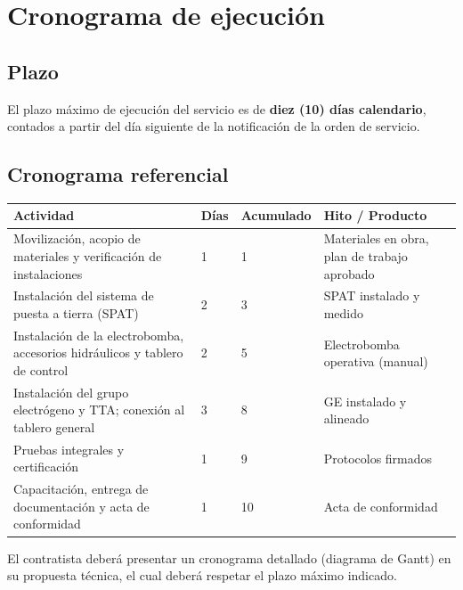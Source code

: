 \documentclass[12pt,a4paper]{article}
\begin{document}
\section{Cronograma de ejecución}

\subsection{Plazo}

El plazo máximo de ejecución del servicio es de \textbf{diez (10) días calendario}, contados a partir del día siguiente de la notificación de la orden de servicio.

\subsection{Cronograma referencial}

\begin{center}
\begin{tabular}{L{5cm}L{1.5cm}L{2cm}L{4.5cm}}
\toprule
\textbf{Actividad} & \textbf{Días} & \textbf{Acumulado} & \textbf{Hito / Producto} \\
\midrule
Movilización, acopio de materiales y verificación de instalaciones & 1 & 1 & Materiales en obra, plan de trabajo aprobado \\
Instalación del sistema de puesta a tierra (SPAT) & 2 & 3 & SPAT instalado y medido \\
Instalación de la electrobomba, accesorios hidráulicos y tablero de control & 2 & 5 & Electrobomba operativa (manual) \\
Instalación del grupo electrógeno y TTA; conexión al tablero general & 3 & 8 & GE instalado y alineado \\
Pruebas integrales y certificación & 1 & 9 & Protocolos firmados \\
Capacitación, entrega de documentación y acta de conformidad & 1 & 10 & Acta de conformidad \\
\bottomrule
\end{tabular}
\end{center}

\noindent El contratista deberá presentar un cronograma detallado (diagrama de Gantt) en su propuesta técnica, el cual deberá respetar el plazo máximo indicado.

\end{document}
